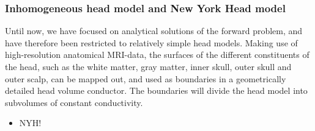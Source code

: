 \documentclass[preprint,10pt,authoryear]{elsarticle}
\newcommand{\sntxt}[1]{{\color{NavyBlue}#1}}
\begin{document}
\subsubsection{Inhomogeneous head model and New York Head model}\label{subsubsec:eeg_BEM}
Until now, we have focused on analytical solutions of the forward problem, and have therefore been restricted to relatively simple head models. Making use of high-resolution anatomical MRI-data, the surfaces of the different constituents of the head, such as the white matter, gray matter, inner skull, outer skull and outer scalp, can be mapped out, and used as boundaries in a geometrically detailed head volume conductor. The boundaries will divide the head model into subvolumes of constant conductivity. 
\begin{itemize}
	\item \sntxt{NYH!}
\end{itemize}



\end{document}
